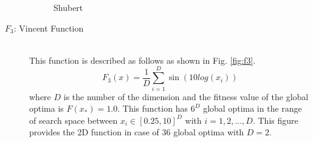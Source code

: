 \documentclass[conference]{IEEEtran}
\begin{document}
\begin{description}
\begin{figure}[h]
\begin{center}
\caption{Shubert}
\label{fig:f2}
\end{center}
\end{figure}

\item[$F_3$: Vincent Function]\mbox{}\\
 This function is described as follows as shown in Fig. \ref{fig:f3}.
 \begin{equation}
F_3(x) = \frac{1}{D} \sum_{i=1}^D \sin(10log(x_i)) 
\end{equation}
where $D$ is the number of the dimension and the fitness value of the global optima is ${F(x_*)=1.0}$. This function has $6^D $ global optima in the range of search space between $x_i \in [0.25, 10]^D$ with $i=1,2,...,D$. This figure provides the 2D function in case of 36 global optima with $D=2$. 


\end{description}
\end{document}

